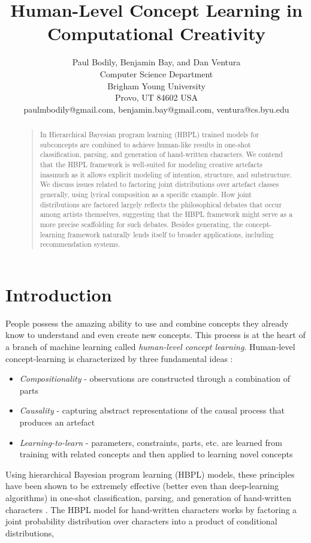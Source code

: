 \documentclass[letterpaper]{article}
\title{Human-Level Concept Learning in Computational Creativity}
\author{Paul Bodily, Benjamin Bay, and Dan Ventura\\
Computer Science Department\\
Brigham Young University\\
Provo, UT 84602  USA\\
paulmbodily@gmail.com, benjamin.bay@gmail.com, ventura@cs.byu.edu\\
}
\begin{document}
 
\maketitle
\begin{abstract}
\begin{quote}
In Hierarchical Bayesian program learning (HBPL) trained models for subconcepts are combined to achieve human-like results in one-shot classification, parsing, and generation of hand-written characters. We contend that the HBPL framework is well-suited for modeling creative artefacts inasmuch as it allows explicit modeling of intention, structure, and substructure. We discuss issues related to factoring joint distributions over artefact classes generally, using lyrical composition as a specific example. How joint distributions are factored largely reflects the philosophical debates that occur among artists themselves, suggesting that the HBPL framework might serve as a more precise scaffolding for such debates. Besides generating, the concept-learning framework naturally lends itself to broader applications, including recommendation systems.
\end{quote}
\end{abstract}

\section{Introduction}

People possess the amazing ability to use and combine concepts they already know to understand and even create new concepts. This process is at the heart of a branch of machine learning called \textit{human-level concept learning}. Human-level concept-learning is characterized by three fundamental ideas \cite{lake2014thesis}:

\begin{itemize}  
\item \emph{Compositionality} - observations are constructed through a combination of parts
\item \emph{Causality} - capturing abstract representations of the causal process that produces an artefact
\item \emph{Learning-to-learn} - parameters, constraints, parts, etc. are learned from training with related concepts and then applied to learning novel concepts
\end{itemize}

Using hierarchical Bayesian program learning (HBPL) models, these principles have been shown to be extremely effective (better even than deep-learning algorithms) in one-shot classification, parsing, and generation of hand-written characters \cite{lake2014thesis}. The HBPL model for hand-written characters works by factoring a joint probability distribution over characters into a product of conditional distributions,
\end{document}
